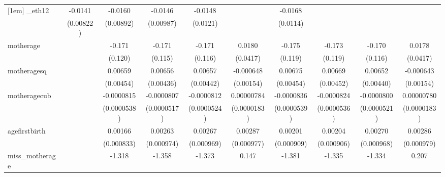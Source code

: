 \begin{table}[htbp]
\begin{tabular}{l*{9}{c}}
[1em]
\_eth12      &     -0.0141\sym{*}  &     -0.0160\sym{*}  &     -0.0146         &     -0.0148         &                     &     -0.0168         &                     &                     &                     \\
            &   (0.00822)         &   (0.00892)         &   (0.00987)         &    (0.0121)         &                     &    (0.0114)         &                     &                     &                     \\
[1em]
motherage   &                     &      -0.171         &      -0.171         &      -0.171         &      0.0180         &      -0.175         &      -0.173         &      -0.170         &      0.0178         \\
            &                     &     (0.120)         &     (0.115)         &     (0.116)         &    (0.0417)         &     (0.119)         &     (0.119)         &     (0.116)         &    (0.0417)         \\
[1em]
motheragesq &                     &     0.00659         &     0.00656         &     0.00657         &   -0.000648         &     0.00675         &     0.00669         &     0.00652         &   -0.000643         \\
            &                     &   (0.00454)         &   (0.00436)         &   (0.00442)         &   (0.00154)         &   (0.00454)         &   (0.00452)         &   (0.00440)         &   (0.00154)         \\
[1em]
motheragecub&                     &  -0.0000815         &  -0.0000807         &  -0.0000812         &  0.00000784         &  -0.0000836         &  -0.0000824         &  -0.0000800         &  0.00000780         \\
            &                     & (0.0000538)         & (0.0000517)         & (0.0000524)         & (0.0000183)         & (0.0000539)         & (0.0000536)         & (0.0000521)         & (0.0000183)         \\
[1em]
agefirstbirth&                     &     0.00166\sym{**} &     0.00263\sym{***}&     0.00267\sym{***}&     0.00287\sym{***}&     0.00201\sym{**} &     0.00204\sym{**} &     0.00270\sym{***}&     0.00286\sym{***}\\
            &                     &  (0.000833)         &  (0.000974)         &  (0.000969)         &  (0.000977)         &  (0.000909)         &  (0.000906)         &  (0.000968)         &  (0.000979)         \\
[1em]
miss\_motherage&                     &      -1.318         &      -1.358         &      -1.373         &       0.147         &      -1.381         &      -1.335         &      -1.334         &       0.207         \\

\end{tabular}
\end{table}
